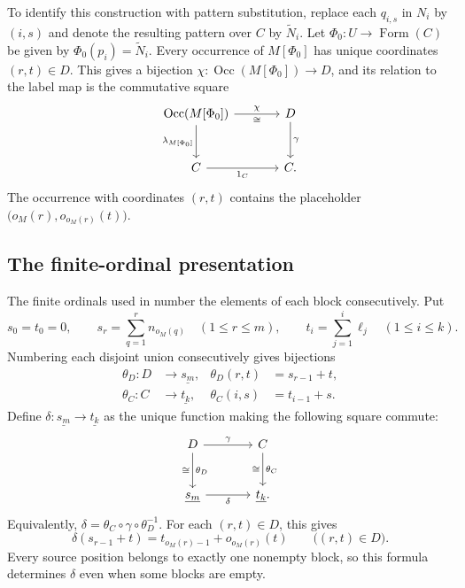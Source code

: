 \documentclass[11pt]{article}
\newcommand{\Occ}{\operatorname{Occ}}
\newcommand{\FormulaSet}{\operatorname{Form}}
\begin{document}
To identify this construction with pattern substitution,
replace each $q_{i,s}$ in $N_i$ by $(i,s)$ and denote the resulting
pattern over $C$ by $\widetilde N_i$. Let
$\Phi_0:U\to\FormulaSet(C)$ be given by $\Phi_0(p_i)=\widetilde N_i$.
Every occurrence of $M[\Phi_0]$ has unique coordinates $(r,t)\in D$.
This gives a bijection $\chi:\Occ(M[\Phi_0])\to D$, and its relation
to the label map is the commutative square
\begin{equation}\label{eq:app-occurrence-labels}
\begin{tikzcd}[column sep=large,row sep=large]
 \Occ(M[\Phi_0])\arrow[r,"\chi","\cong"']
    \arrow[d,"\lambda_{M[\Phi_0]}"']&D\arrow[d,"\gamma"]\\
 C\arrow[r,"1_C"']&C.
\end{tikzcd}
\end{equation}
The occurrence with coordinates $(r,t)$ contains the placeholder
$\bigl(o_M(r),o_{o_M(r)}(t)\bigr)$.

\subsection{The finite-ordinal presentation}\label{app:ordinals}

The finite ordinals used in \cite{DP} number the elements of each
block consecutively. Put
\[
 s_0=t_0=0,\qquad
 s_r=\sum_{q=1}^{r}n_{o_M(q)}\quad(1\leq r\leq m),\qquad
 t_i=\sum_{j=1}^{i}\ell_j\quad(1\leq i\leq k).
\]
Numbering each disjoint union consecutively gives bijections
\[
 \begin{aligned}
 \theta_D:D&\longrightarrow\underline{s_m},
       &\theta_D(r,t)&=s_{r-1}+t,\\
 \theta_C:C&\longrightarrow\underline{t_k},
       &\theta_C(i,s)&=t_{i-1}+s.
 \end{aligned}
\]
Define $\delta:\underline{s_m}\to\underline{t_k}$ as the unique
function making the following square commute:
\begin{equation}\label{eq:app-ordinal}
\begin{tikzcd}[column sep=large,row sep=large]
 D\arrow[r,"\gamma"]\arrow[d,"\theta_D","\cong"']
    &C\arrow[d,"\theta_C","\cong"']\\
 \underline{s_m}\arrow[r,"\delta"']&\underline{t_k}.
\end{tikzcd}
\end{equation}
Equivalently, $\delta=\theta_C\circ\gamma\circ\theta_D^{-1}$.
For each $(r,t)\in D$, this gives
\begin{equation}\label{eq:app-coordinate}
 \delta(s_{r-1}+t)=t_{o_M(r)-1}+o_{o_M(r)}(t)
 \qquad\bigl((r,t)\in D\bigr).
\end{equation}
Every source position belongs to exactly one nonempty block, so this
formula determines $\delta$ even when some blocks are empty.
\end{document}
